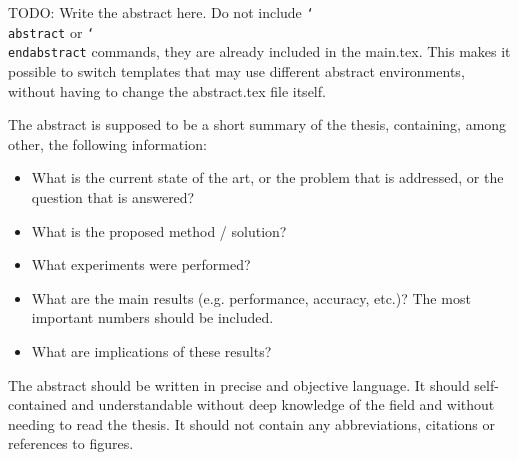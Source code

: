 TODO: Write the abstract here. Do not include \texttt{\char`\\abstract} or \texttt{\char`\\endabstract} commands, they are already included in the main.tex.
This makes it possible to switch templates that may use different abstract environments, without having to change the abstract.tex file itself.

The abstract is supposed to be a short summary of the thesis, containing, among other, the following information:
\begin{itemize}
    \item What is the current state of the art, or the problem that is addressed, or the question that is answered?
    \item What is the proposed method / solution?
    \item What experiments were performed?
    \item What are the main results (e.g. performance, accuracy, etc.)? The most important numbers should be included.
    \item What are implications of these results?
\end{itemize}

The abstract should be written in precise and objective language.
It should self-contained and understandable without deep knowledge of the field and without needing to read the thesis.
It should not contain any abbreviations, citations or references to figures.
